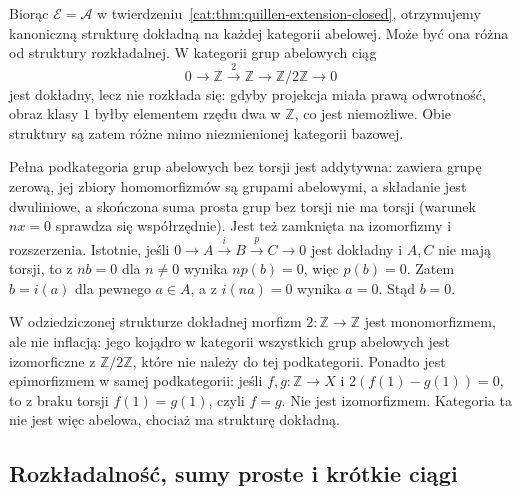\begin{przyklad}\label{cat:ex:quillen-abelian}
Biorąc $\mathcal E=\mathcal A$ w twierdzeniu~\ref{cat:thm:quillen-extension-closed}, otrzymujemy kanoniczną strukturę dokładną na każdej kategorii abelowej. Może być ona różna od struktury rozkładalnej. W kategorii grup abelowych ciąg
\[
 0\longrightarrow\mathbb Z\xrightarrow{\,2\,}\mathbb Z
 \longrightarrow\mathbb Z/2\mathbb Z\longrightarrow0
\]
jest dokładny, lecz nie rozkłada się: gdyby projekcja miała prawą odwrotność, obraz klasy $1$ byłby elementem rzędu dwa w $\mathbb Z$, co jest niemożliwe. Obie struktury są zatem różne mimo niezmienionej kategorii bazowej.
\end{przyklad}

\begin{przyklad}\label{cat:ex:quillen-torsionfree}
Pełna podkategoria grup abelowych bez torsji jest addytywna: zawiera grupę zerową, jej zbiory homomorfizmów są grupami abelowymi, a składanie jest dwuliniowe, a skończona suma prosta grup bez torsji nie ma torsji (warunek $nx=0$ sprawdza się współrzędnie). Jest też zamknięta na izomorfizmy i rozszerzenia. Istotnie, jeśli $0\to A\xrightarrow{i}B\xrightarrow{p}C\to0$ jest dokładny i $A,C$ nie mają torsji, to z $nb=0$ dla $n\neq0$ wynika $np(b)=0$, więc $p(b)=0$. Zatem $b=i(a)$ dla pewnego $a\in A$, a z $i(na)=0$ wynika $a=0$. Stąd $b=0$.

W odziedziczonej strukturze dokładnej morfizm $2:\mathbb Z\to\mathbb Z$ jest monomorfizmem, ale nie inflacją: jego kojądro w kategorii wszystkich grup abelowych jest izomorficzne z $\mathbb Z/2\mathbb Z$, które nie należy do tej podkategorii. Ponadto jest epimorfizmem w samej podkategorii: jeśli $f,g:\mathbb Z\to X$ i $2(f(1)-g(1))=0$, to z braku torsji $f(1)=g(1)$, czyli $f=g$. Nie jest izomorfizmem. Kategoria ta nie jest więc abelowa, chociaż ma strukturę dokładną.
\end{przyklad}

\subsection{Rozkładalność, sumy proste i krótkie ciągi}

